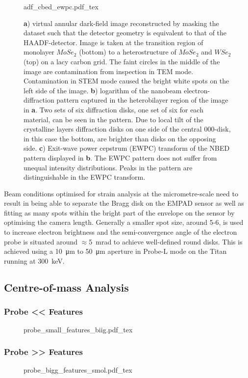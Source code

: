 \begin{figure}
	\centering
	\def\svgwidth{0.9\linewidth}
	{adf_cbed_ewpc.pdf_tex}
	\caption{\textbf{a}) virtual annular dark-field image reconstructed by masking the dataset such that the detector geometry is equivalent to that of the HAADF-detector. Image is taken at the transition region of monolayer $MoSe_2$ (bottom) to a heterostructure of $MoSe_2$ and $WSe_2$ (top) on a lacy carbon grid. The faint circles in the middle of the image are contamination from inspection in TEM mode. Contamination in STEM mode caused the bright white spots on the left side of the image. \textbf{b}) logarithm of the nanobeam electron-diffraction pattern captured in the heterobilayer region of the image in \textbf{a}. Two sets of six diffraction disks, one set of six for each material, can be seen in the pattern. Due to local tilt of the crystalline layers diffraction disks on one side of the central $000$-disk, in this case the bottom, are brighter than disks on the opposing side. \textbf{c}) Exit-wave power cepstrum (EWPC) transform of the NBED pattern displayed in \textbf{b}. The EWPC pattern does not suffer from unequal intensity distributions. Peaks in the pattern are distinguishable in the EWPC transform.}
	\label{fig:adf_nbed_ewpc}
\end{figure}

Beam conditions optimised for strain analysis at the micrometre-scale need to result in being able to separate the Bragg disk on the EMPAD sensor as well as fitting as many spots within the bright part of the envelope on the sensor by optimising the camera length. Generally a smaller spot size, around 5-6, is used to increase electron brightness and the semi-convergence angle of the electron probe is situated around $\approx$\SI{5}{\milli\radian} to achieve well-defined round disks. 
%
This is achieved using a \SI{10}{\micro\meter} to \SI{50}{\micro\meter} aperture in Probe-L mode on the Titan running at \SI{300}{\kilo\electronvolt}.



\subsection{Centre-of-mass Analysis}
\subsubsection{Probe << Features}
\begin{figure}[h]
	\centering
	\def\svgwidth{1\linewidth}
	{probe_small_features_biig.pdf_tex}
	\caption{}
	\label{fig:4d_dataset}
\end{figure}
\subsubsection{Probe >> Features}

\begin{figure}[h]
	\centering
	\def\svgwidth{1\linewidth}
    {probe_bigg_features_smol.pdf_tex}
	\caption{}
	\label{fig:4d_dataset}
\end{figure}
